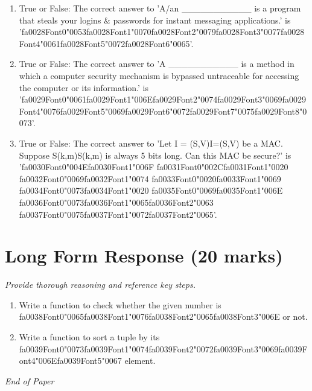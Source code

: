 \documentclass[12pt]{article}
\begin{document}
\begin{enumerate}[label=\arabic*.]
\item True or False: The correct answer to 'A/an \_\_\_\_\_\_\_\_\_\_\_ is a program that steals your logins \& passwords for instant messaging applications.' is '{\csname fa0028Font0\endcsname\char"0053}{\csname fa0028Font1\endcsname\char"0070}{\csname fa0028Font2\endcsname\char"0079}{\csname fa0028Font3\endcsname\char"0077}{\csname fa0028Font4\endcsname\char"0061}{\csname fa0028Font5\endcsname\char"0072}{\csname fa0028Font6\endcsname\char"0065}'.
\item True or False: The correct answer to 'A \_\_\_\_\_\_\_\_\_\_\_ is a method in which a computer security mechanism is bypassed untraceable for accessing the computer or its information.' is '{\csname fa0029Font0\endcsname\char"0061}{\csname fa0029Font1\endcsname\char"006E}{\csname fa0029Font2\endcsname\char"0074}{\csname fa0029Font3\endcsname\char"0069}{\csname fa0029Font4\endcsname\char"0076}{\csname fa0029Font5\endcsname\char"0069}{\csname fa0029Font6\endcsname\char"0072}{\csname fa0029Font7\endcsname\char"0075}{\csname fa0029Font8\endcsname\char"0073}'.
\item True or False: The correct answer to 'Let I = (S,V)I=(S,V) be a MAC. Suppose S(k,m)S(k,m) is always 5 bits long. Can this MAC be secure?' is '{\csname fa0030Font0\endcsname\char"004E}{\csname fa0030Font1\endcsname\char"006F} {\csname fa0031Font0\endcsname\char"002C}{\csname fa0031Font1\endcsname\char"0020} {\csname fa0032Font0\endcsname\char"0069}{\csname fa0032Font1\endcsname\char"0074} {\csname fa0033Font0\endcsname\char"0020}{\csname fa0033Font1\endcsname\char"0069} {\csname fa0034Font0\endcsname\char"0073}{\csname fa0034Font1\endcsname\char"0020} {\csname fa0035Font0\endcsname\char"0069}{\csname fa0035Font1\endcsname\char"006E} {\csname fa0036Font0\endcsname\char"0073}{\csname fa0036Font1\endcsname\char"0065}{\csname fa0036Font2\endcsname\char"0063} {\csname fa0037Font0\endcsname\char"0075}{\csname fa0037Font1\endcsname\char"0072}{\csname fa0037Font2\endcsname\char"0065}'.
\end{enumerate}

\section*{Long Form Response (20 marks)}
\textit{Provide thorough reasoning and reference key steps.}
\begin{enumerate}[label=\arabic*.]
\item Write a function to check whether the given number is {\csname fa0038Font0\endcsname\char"0065}{\csname fa0038Font1\endcsname\char"0076}{\csname fa0038Font2\endcsname\char"0065}{\csname fa0038Font3\endcsname\char"006E} or not.
\item Write a function to sort a tuple by its {\csname fa0039Font0\endcsname\char"0073}{\csname fa0039Font1\endcsname\char"0074}{\csname fa0039Font2\endcsname\char"0072}{\csname fa0039Font3\endcsname\char"0069}{\csname fa0039Font4\endcsname\char"006E}{\csname fa0039Font5\endcsname\char"0067} element.
\end{enumerate}

\vfill
\noindent\textit{End of Paper}
\end{document}
